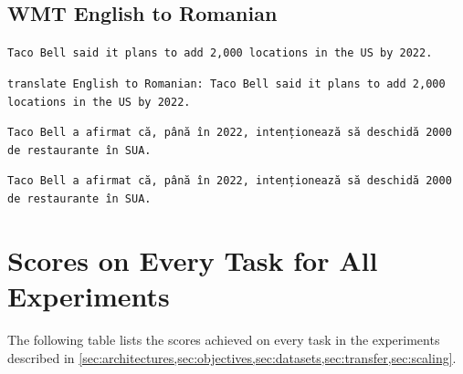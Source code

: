 \documentclass[twoside,11pt]{article}
\begin{document}
\subsection{WMT English to Romanian}
\begin{description}[leftmargin=0.5cm]
\item[Original input:] \texttt{Taco Bell said it plans to add 2,000 locations in the US by 2022.}
\item[Processed input:] \texttt{translate English to Romanian:\ Taco Bell said it plans to add 2,000 locations in the US by 2022.}
\item[Original target:] \texttt{Taco Bell a afirmat că, până în 2022, intenționează să deschidă 2000 de restaurante în SUA.}
\item[Processed target:] \texttt{Taco Bell a afirmat că, până în 2022, intenționează să deschidă 2000 de restaurante în SUA.}
\end{description}

\clearpage

\section{Scores on Every Task for All Experiments}
\label{sec:giant}

The following table lists the scores achieved on every task in the experiments described in \cref{sec:architectures,sec:objectives,sec:datasets,sec:transfer,sec:scaling}.

\clearpage
\eject \pdfpagewidth=58cm \pdfpageheight=39cm
\thispagestyle{empty}
\end{document}
